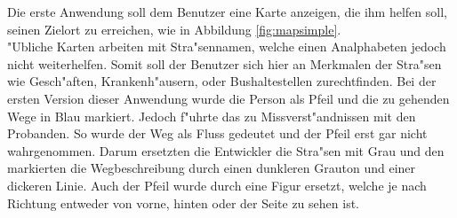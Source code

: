Die erste Anwendung soll dem Benutzer eine Karte anzeigen, die ihm helfen soll, seinen Zielort zu erreichen, wie in Abbildung \ref{fig:mapsimple}.\\
"Ubliche Karten arbeiten mit Stra"sennamen, welche einen Analphabeten jedoch nicht weiterhelfen. Somit soll der Benutzer sich  hier an Merkmalen der Stra"sen wie Gesch"aften, Krankenh"ausern, oder Bushaltestellen zurechtfinden.
Bei der ersten Version dieser Anwendung wurde die Person als Pfeil und die zu gehenden Wege in Blau markiert. Jedoch f"uhrte das zu Missverst"andnissen mit den Probanden. So wurde der Weg als Fluss gedeutet und der Pfeil erst gar nicht wahrgenommen. Darum ersetzten die Entwickler die Stra"sen mit Grau und den markierten die Wegbeschreibung durch einen dunkleren Grauton und einer dickeren Linie.
Auch der Pfeil wurde durch eine Figur ersetzt, welche je nach Richtung entweder von vorne, hinten oder der Seite zu sehen ist.

